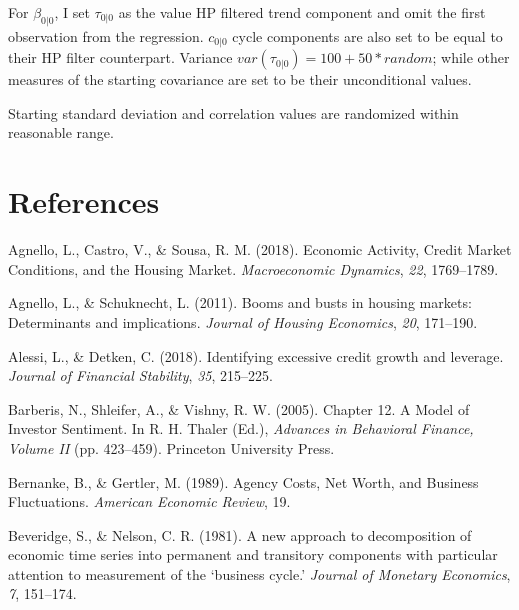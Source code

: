 \documentclass[
  12pt,
]{article}
\newlength{\cslhangindent}
\newlength{\cslentryspacingunit} %
\newenvironment{CSLReferences}[2] %
 {%
  \setlength{\parindent}{0pt}
  \ifodd #1
  \let\oldpar\par
  \def\par{\hangindent=\cslhangindent\oldpar}
  \fi
  \setlength{\parskip}{#2\cslentryspacingunit}
 }%
 {}
\begin{document}
For \(\beta_{0|0}\), I set \(\tau_{0|0}\) as the value HP filtered trend component and omit the first observation from the regression. \(c_{0|0}\) cycle components are also set to be equal to their HP filter counterpart. Variance \(var(\tau_{0|0}) =100+50*random\); while other measures of the starting covariance are set to be their unconditional values.

Starting standard deviation and correlation values are randomized within reasonable range.

\hypertarget{references}{%
\section*{References}\label{references}}

\hypertarget{refs}{}
\begin{CSLReferences}{1}{0}
\leavevmode{}%
Agnello, L., Castro, V., \& Sousa, R. M. (2018). Economic {Activity}, {Credit Market Conditions}, and the {Housing Market}. \emph{Macroeconomic Dynamics}, \emph{22}, 1769--1789.

\leavevmode{}%
Agnello, L., \& Schuknecht, L. (2011). Booms and busts in housing markets: {Determinants} and implications. \emph{Journal of Housing Economics}, \emph{20}, 171--190.

\leavevmode{}%
Alessi, L., \& Detken, C. (2018). Identifying excessive credit growth and leverage. \emph{Journal of Financial Stability}, \emph{35}, 215--225.

\leavevmode{}%
Barberis, N., Shleifer, A., \& Vishny, R. W. (2005). Chapter 12. {A Model} of {Investor Sentiment}. In R. H. Thaler (Ed.), \emph{Advances in {Behavioral Finance}, {Volume II}} (pp. 423--459). {Princeton University Press}.

\leavevmode{}%
Bernanke, B., \& Gertler, M. (1989). Agency {Costs}, {Net Worth}, and {Business Fluctuations}. \emph{American Economic Review}, 19.

\leavevmode{}%
Beveridge, S., \& Nelson, C. R. (1981). A new approach to decomposition of economic time series into permanent and transitory components with particular attention to measurement of the {`business cycle.'} \emph{Journal of Monetary Economics}, \emph{7}, 151--174.


\end{CSLReferences}
\end{document}
